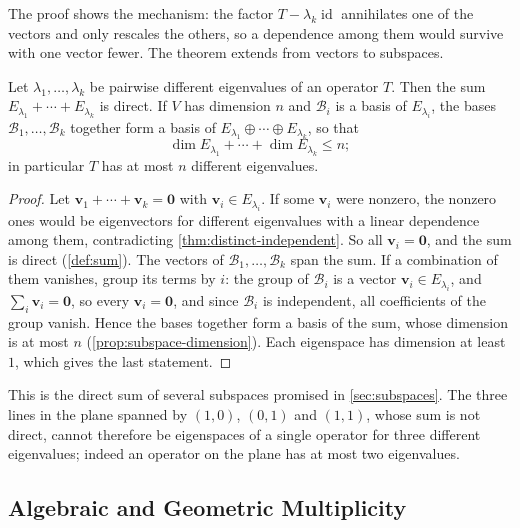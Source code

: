 The proof shows the mechanism: the factor $T-\lambda_k\operatorname{id}$ annihilates one of the vectors and only rescales the others, so a dependence among them would survive with one vector fewer. The theorem extends from vectors to subspaces.

\begin{corollary}
\label{cor:eigenspaces-direct}
Let $\lambda_1,\ldots,\lambda_k$ be pairwise different eigenvalues of an operator $T$. Then the sum $E_{\lambda_1}+\cdots+E_{\lambda_k}$ is direct. If $V$ has dimension $n$ and $\mathcal B_i$ is a basis of $E_{\lambda_i}$, the bases $\mathcal B_1,\ldots,\mathcal B_k$ together form a basis of $E_{\lambda_1}\oplus\cdots\oplus E_{\lambda_k}$, so that
\[
\dim E_{\lambda_1}+\cdots+\dim E_{\lambda_k}\le n ;
\]
in particular $T$ has at most $n$ different eigenvalues.
\end{corollary}

\begin{proof}
Let $\mathbf v_1+\cdots+\mathbf v_k=\mathbf 0$ with $\mathbf v_i\in E_{\lambda_i}$. If some $\mathbf v_i$ were nonzero, the nonzero ones would be eigenvectors for different eigenvalues with a linear dependence among them, contradicting \cref{thm:distinct-independent}. So all $\mathbf v_i=\mathbf 0$, and the sum is direct (\cref{def:sum}). The vectors of $\mathcal B_1,\ldots,\mathcal B_k$ span the sum. If a combination of them vanishes, group its terms by $i$: the group of $\mathcal B_i$ is a vector $\mathbf v_i\in E_{\lambda_i}$, and $\sum_i\mathbf v_i=\mathbf 0$, so every $\mathbf v_i=\mathbf 0$, and since $\mathcal B_i$ is independent, all coefficients of the group vanish. Hence the bases together form a basis of the sum, whose dimension is at most $n$ (\cref{prop:subspace-dimension}). Each eigenspace has dimension at least $1$, which gives the last statement.
\end{proof}

This is the direct sum of several subspaces promised in \cref{sec:subspaces}. The three lines in the plane spanned by $(1,0)$, $(0,1)$ and $(1,1)$, whose sum is not direct, cannot therefore be eigenspaces of a single operator for three different eigenvalues; indeed an operator on the plane has at most two eigenvalues.

\subsection{Algebraic and Geometric Multiplicity}

